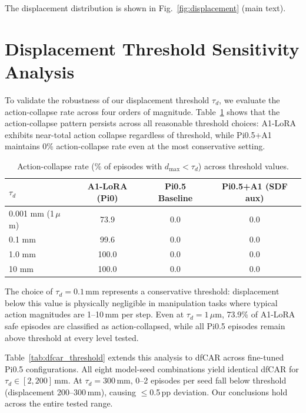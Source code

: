 The displacement distribution is shown in Fig.~\ref{fig:displacement} (main text).

\section{Displacement Threshold Sensitivity Analysis}
\label{sec:appendix_threshold}

To validate the robustness of our displacement threshold $\tau_d$, we evaluate the action-collapse rate across four orders of magnitude. Table~\ref{tab:threshold_sensitivity} shows that the action-collapse pattern persists across all reasonable threshold choices: A1-LoRA exhibits near-total action collapse regardless of threshold, while Pi0.5+A1 maintains 0\% action-collapse rate even at the most conservative setting.

\begin{table}[h]
\centering
\caption{Action-collapse rate (\% of episodes with $d_\mathrm{max} < \tau_d$) across threshold values.}
\label{tab:threshold_sensitivity}
\begin{tabular}{lccc}
\toprule
$\tau_d$ & A1-LoRA (Pi0) & Pi0.5 Baseline & Pi0.5+A1 (SDF aux) \\
\midrule
0.001 mm (1\,$\mu$m) & 73.9 & 0.0 & 0.0 \\
0.1 mm  & 99.6 & 0.0 & 0.0 \\
1.0 mm  & 100.0 & 0.0 & 0.0 \\
10 mm   & 100.0 & 0.0 & 0.0 \\
\bottomrule
\end{tabular}
\end{table}

The choice of $\tau_d = 0.1$\,mm represents a conservative threshold: displacement below this value is physically negligible in manipulation tasks where typical action magnitudes are 1--10\,mm per step. Even at $\tau_d = 1$\,$\mu$m, 73.9\% of A1-LoRA safe episodes are classified as action-collapsed, while all Pi0.5 episodes remain above threshold at every level tested.

Table~\ref{tab:dfcar_threshold} extends this analysis to dfCAR across fine-tuned Pi0.5 configurations. All eight model-seed combinations yield identical dfCAR for $\tau_d \in [2, 200]$\,mm. At $\tau_d = 300$\,mm, 0--2 episodes per seed fall below threshold (displacement 200--300\,mm), causing $\leq$0.5\,pp deviation. Our conclusions hold across the entire tested range.

